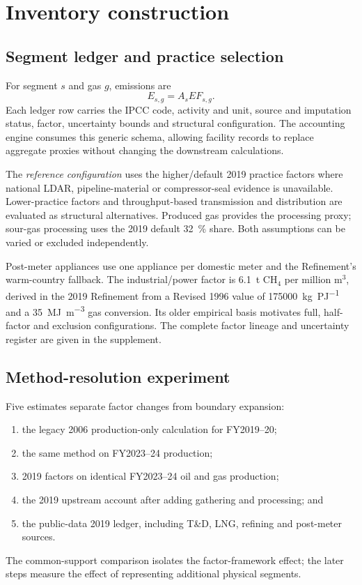 \section{Inventory construction}
\label{sec:methods}

\subsection{Segment ledger and practice selection}

For segment $s$ and gas $g$, emissions are
\begin{equation}
E_{s,g}=A_s EF_{s,g}.
\end{equation}
Each ledger row carries the IPCC code, activity and unit, source and imputation status, factor,
uncertainty bounds and structural configuration. The accounting engine consumes this generic
schema, allowing facility records to replace aggregate proxies without changing the downstream
calculations.

The \emph{reference configuration} uses the higher/default 2019 practice factors where national
LDAR, pipeline-material or compressor-seal evidence is unavailable. Lower-practice factors and
throughput-based transmission and distribution are evaluated as structural alternatives.
Produced gas provides the processing proxy; sour-gas processing uses the 2019 default
\SI{32}{\percent} share. Both assumptions can be varied or excluded independently.

Post-meter appliances use one appliance per domestic meter and the Refinement's warm-country
fallback. The industrial/power factor is \SI{6.1}{\tonne} CH$_4$ per million m$^3$, derived in
the 2019 Refinement from a Revised 1996 value of \SI{175000}{\kilogram\per\peta\joule} and a
\SI{35}{\mega\joule\per\cubic\metre} gas conversion. Its older empirical basis motivates full,
half-factor and exclusion configurations. The complete factor lineage and uncertainty register
are given in the supplement.

\subsection{Method-resolution experiment}

Five estimates separate factor changes from boundary expansion:
\begin{enumerate}[leftmargin=*,itemsep=2pt]
\item the legacy 2006 production-only calculation for FY2019--20;
\item the same method on FY2023--24 production;
\item 2019 factors on identical FY2023--24 oil and gas production;
\item the 2019 upstream account after adding gathering and processing; and
\item the public-data 2019 ledger, including T\&D, LNG, refining and post-meter sources.
\end{enumerate}
The common-support comparison isolates the factor-framework effect; the later steps measure the
effect of representing additional physical segments.

